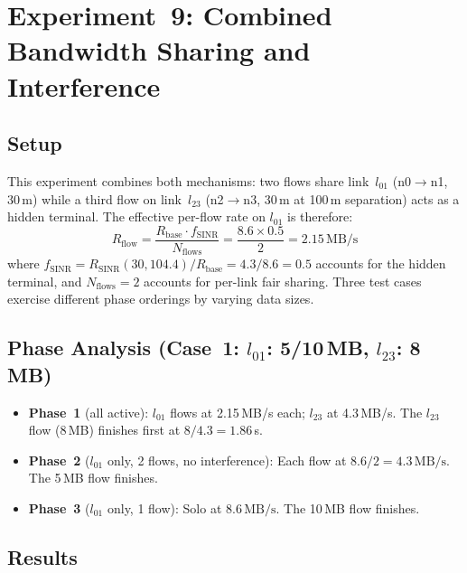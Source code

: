 \documentclass[11pt,a4paper]{article}
\newcommand{\MBs}{\,\text{MB/s}}
\begin{document}
\section{Experiment~9: Combined Bandwidth Sharing and Interference}
\label{sec:exp9}

\subsection{Setup}
This experiment combines both mechanisms: two flows share link~$l_{01}$ (n0$\to$n1, 30\,m) while a third flow on link~$l_{23}$ (n2$\to$n3, 30\,m at 100\,m separation) acts as a hidden terminal. The effective per-flow rate on $l_{01}$ is therefore:
\begin{equation}
    R_{\text{flow}} = \frac{R_{\text{base}} \cdot f_{\text{SINR}}}{N_{\text{flows}}} = \frac{8.6 \times 0.5}{2} = 2.15 \MBs
\end{equation}
where $f_{\text{SINR}} = R_{\text{SINR}}(30, 104.4) / R_{\text{base}} = 4.3/8.6 = 0.5$ accounts for the hidden terminal, and $N_{\text{flows}} = 2$ accounts for per-link fair sharing. Three test cases exercise different phase orderings by varying data sizes.

\subsection{Phase Analysis (Case~1: $l_{01}$: 5/10\,MB, $l_{23}$: 8\,MB)}
\begin{itemize}    \item \textbf{Phase~1} (all active): $l_{01}$ flows at 2.15\,MB/s each; $l_{23}$ at 4.3\,MB/s. The $l_{23}$ flow (8\,MB) finishes first at $8/4.3 = 1.86\,$s.
    \item \textbf{Phase~2} ($l_{01}$ only, 2 flows, no interference): Each flow at $8.6/2 = 4.3\MBs$. The 5\,MB flow finishes.
    \item \textbf{Phase~3} ($l_{01}$ only, 1 flow): Solo at $8.6\MBs$. The 10\,MB flow finishes.
\end{itemize}

\subsection{Results}
\end{document}
